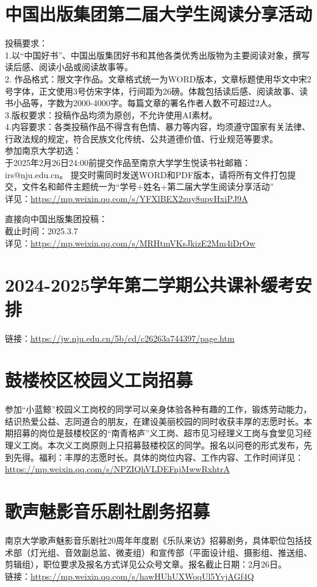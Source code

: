 \documentclass[letterpaper, 12pt]{article}
\begin{document}
\begin{multicols}{2}
\section{中国出版集团第二届大学生阅读分享活动}
投稿要求：\\
1.以“中国好书”、中国出版集团好书和其他各类优秀出版物为主要阅读对象，撰写读后感、阅读小品或阅读故事等。\\
2. 作品格式：限文字作品。文章格式统一为WORD版本，文章标题使用华文中宋2号字体，正文使用3号仿宋字体，行间距为26磅。体裁包括读后感、阅读故事、读书小品等，字数为2000-4000字。每篇文章的署名作者人数不可超过2人。\\
3.版权要求：投稿作品均须为原创，不允许使用AI素材。\\
4.内容要求：各类投稿作品不得含有色情、暴力等内容，均须遵守国家有关法律、行政法规的规定，符合民族文化传统、公共道德价值、行业规范等要求。\\

参加南京大学初选：\\
于2025年2月26日24:00前提交作品至南京大学学生悦读书社邮箱：irs@nju.edu.cn。
提交时需同时发送WORD和PDF版本，请将所有文件打包提交，文件名和邮件主题统一为“学号+姓名+第二届大学生阅读分享活动”\\
详见：\url{https://mp.weixin.qq.com/s/YFXlBEX2zuy8upvHxiPJ9A}

直接向中国出版集团投稿：\\
截止时间：2025.3.7\\
详见：\url{https://mp.weixin.qq.com/s/MRHtmVKsJkizE2Mm4iDrOw}
\section{2024-2025学年第二学期公共课补缓考安排}
链接：\url{https://jw.nju.edu.cn/5b/cd/c26263a744397/page.htm}\\

\section{鼓楼校区校园义工岗招募}
参加“小蓝鲸”校园义工岗校的同学可以亲身体验各种有趣的工作，锻炼劳动能力，结识热爱公益、志同道合的朋友，在建设美丽校园的同时收获丰厚的志愿时长。本期招募的岗位是鼓楼校区的“南青格庐”义工岗、超市见习经理义工岗与食堂见习经理义工岗。本次义工岗原则上只招募鼓楼校区的同学。报名以问卷的形式发布，先到先得。福利：丰厚的志愿时长。具体的岗位内容、工作内容、工作时间详见：\url{https://mp.weixin.qq.com/s/NPZIQhVLDEFnjMwwRxhtrA}\\


\section{歌声魅影音乐剧社剧务招募}
南京大学歌声魅影音乐剧社20周年年度剧《乐队来访》招募剧务，具体职位包括技术部（灯光组、音效副总监、微麦组）和宣传部（平面设计组、摄影组、推送组、剪辑组），职位要求及报名方式详见公众号文章。报名截止日期：2月26日。\\
链接：\url{https://mp.weixin.qq.com/s/hawHUhUXWoqUl5YvjAGf4Q}\\


\end{multicols}
\end{document}
